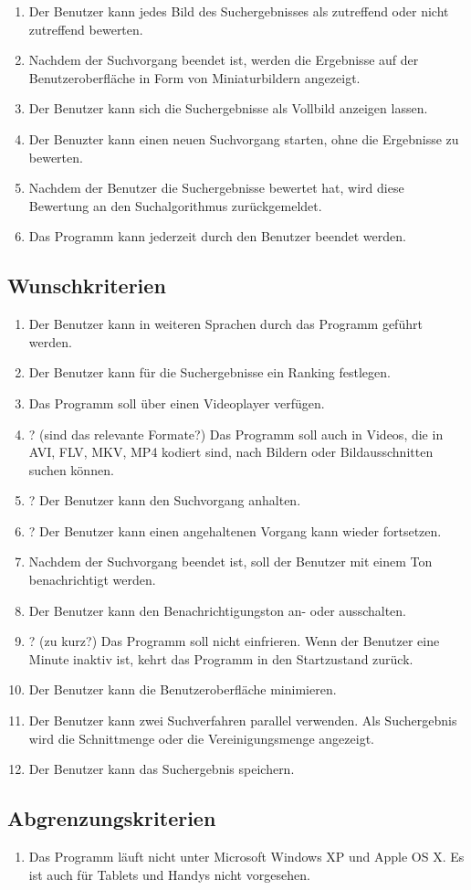 \begin{enumerate} [label=\bfseries /MK \arabic*0/]
\item Der Benutzer kann jedes Bild des Suchergebnisses als zutreffend oder nicht zutreffend bewerten.
\item Nachdem der Suchvorgang beendet ist, werden die Ergebnisse auf der Benutzeroberfläche in Form von Miniaturbildern angezeigt.
\item Der Benutzer kann sich die Suchergebnisse als Vollbild anzeigen lassen.
\item Der Benuzter kann einen neuen Suchvorgang starten, ohne die Ergebnisse zu bewerten.
\item Nachdem der Benutzer die Suchergebnisse bewertet hat, wird diese Bewertung an den Suchalgorithmus zurückgemeldet.
\item Das Programm kann jederzeit durch den Benutzer beendet werden.
\end{enumerate}
\subsection{Wunschkriterien}
\begin{enumerate} [label=\bfseries /WK \arabic*0/]
\item Der Benutzer kann in weiteren Sprachen durch das Programm geführt werden.
\item Der Benutzer kann für die Suchergebnisse ein Ranking festlegen. 
\item Das Programm soll über einen Videoplayer verfügen.
\item ? (sind das relevante Formate?) Das Programm soll auch in Videos, die in AVI, FLV, MKV, MP4 kodiert sind, nach Bildern oder Bildausschnitten suchen können.
\item ? Der Benutzer kann den Suchvorgang anhalten.
\item ? Der Benutzer kann einen angehaltenen Vorgang kann wieder fortsetzen.
\item Nachdem der Suchvorgang beendet ist, soll der Benutzer mit einem Ton benachrichtigt werden.
\item Der Benutzer kann den Benachrichtigungston an- oder ausschalten.
\item ? (zu kurz?) Das Programm soll nicht einfrieren. Wenn der Benutzer eine Minute inaktiv ist, kehrt das Programm in den Startzustand zurück.
\item Der Benutzer kann die Benutzeroberfläche minimieren. 
\item Der Benutzer kann zwei Suchverfahren parallel verwenden. Als Suchergebnis wird die Schnittmenge oder die Vereinigungsmenge angezeigt.
\item Der Benutzer kann das Suchergebnis speichern. 
\end{enumerate}
\subsection{Abgrenzungskriterien}
\begin{enumerate} [label=\bfseries /AK \arabic*0/]
\item Das Programm läuft nicht unter Microsoft Windows XP und  Apple OS X. Es ist auch für Tablets und Handys nicht vorgesehen.
\end{enumerate}
